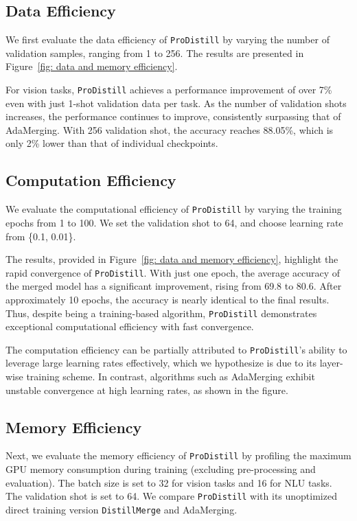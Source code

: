 \subsection{Data Efficiency}
\label{sec: data efficiency}
We first evaluate the data efficiency of \texttt{ProDistill} by varying the number of validation samples, ranging from 1 to 256. The results are presented in Figure~\ref{fig: data and memory efficiency}. 

For vision tasks, \texttt{ProDistill} achieves a performance improvement of over 7\% even with just 1-shot validation data per task. As the number of validation shots increases, the performance continues to improve, consistently surpassing that of AdaMerging. With 256 validation shot, the accuracy reaches 88.05\%, which is only 2\% lower than that of individual checkpoints. 

\subsection{Computation Efficiency}
\label{sec: compute efficiency}

We evaluate the computational efficiency of \texttt{ProDistill} by varying the training epochs from 1 to 100. We set the validation shot to 64, and choose learning rate from \{0.1, 0.01\}.  

The results, provided in Figure~\ref{fig: data and memory efficiency}, highlight the rapid convergence of \texttt{ProDistill}. With just one epoch, the average accuracy of the merged model has a significant improvement, rising from 69.8 to 80.6. After approximately 10 epochs, the accuracy is nearly identical to the final results. Thus, despite being a training-based algorithm, \texttt{ProDistill} demonstrates exceptional computational efficiency with fast convergence.

The computation efficiency can be partially attributed to \texttt{ProDistill}'s ability to leverage large learning rates effectively, which we hypothesize is due to its layer-wise training scheme. In contrast, algorithms such as AdaMerging exhibit unstable convergence at high learning rates, as shown in the figure.


\subsection{Memory Efficiency}
\label{sec: memory efficiency}
Next, we evaluate the memory efficiency of \texttt{ProDistill} by profiling the maximum GPU memory consumption during training (excluding pre-processing and evaluation). The batch size is set to 32 for vision tasks and 16 for NLU tasks. The validation shot is set to 64. We compare \texttt{ProDistill} with its unoptimized direct training version \texttt{DistillMerge} and AdaMerging. 

